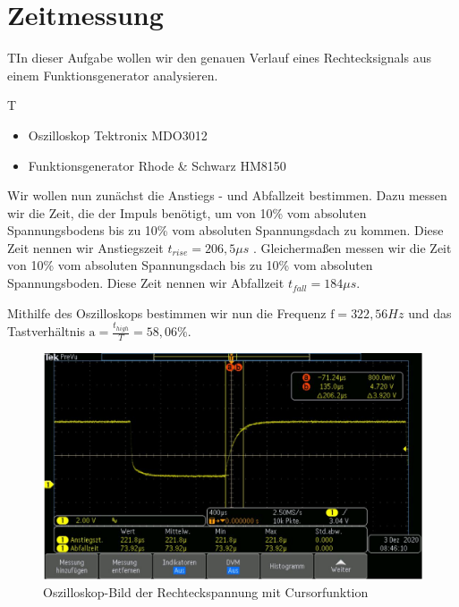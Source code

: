 \documentclass{article}
\begin{document}
\section{Zeitmessung}

\begin{task}
    TIn dieser Aufgabe wollen wir den genauen Verlauf eines Rechtecksignals aus einem Funktionsgenerator analysieren.
\end{task}
\begin{devlist}
    T\begin{itemize}
        \item Oszilloskop Tektronix MDO3012
        \item Funktionsgenerator Rhode \& Schwarz HM8150
    \end{itemize}
\end{devlist}
Wir wollen nun zunächst die Anstiegs - und Abfallzeit bestimmen. Dazu messen wir die Zeit, die der Impuls benötigt, um von 10\%
vom absoluten Spannungsbodens bis zu 10\% vom absoluten Spannungsdach zu kommen. Diese Zeit nennen wir Anstiegszeit $t_{rise}=206,5\mu s $ . Gleichermaßen
messen wir die Zeit von 10\% vom absoluten Spannungsdach bis zu 10\% vom absoluten Spannungsboden. Diese Zeit nennen wir Abfallzeit $t_{fall} = 184\mu s$.

Mithilfe des Oszilloskops bestimmen wir nun die Frequenz $\mathrm{f} = 322,56Hz$ und das Tastverhältnis $\mathrm{a} = \frac{t_{high}}{T} = 58,06\%$.

\begin{figure}[h]
    \begin{center}
        \includegraphics[scale=0.45]{../assets/images/ET2P4/aufgabe1.JPG}
        \caption{Oszilloskop-Bild der Rechteckspannung mit Cursorfunktion}
    \end{center}
\end{figure}
\end{document}
